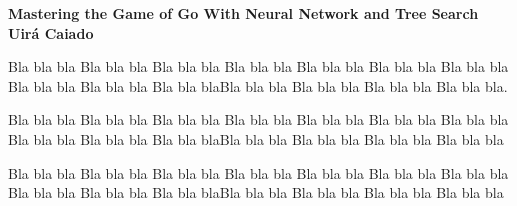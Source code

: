 \documentclass[a4paper]{article}
\begin{document}

\begin{center}

{\bf \large Mastering the Game of Go With Neural Network and Tree Search \\ \small Uirá Caiado}
\end{center}


Bla bla bla Bla bla bla Bla bla bla Bla bla bla Bla bla bla Bla bla bla Bla bla bla Bla bla bla Bla bla bla Bla bla blaBla bla bla Bla bla bla Bla bla bla Bla bla bla.

Bla bla bla Bla bla bla Bla bla bla Bla bla bla Bla bla bla Bla bla bla Bla bla bla Bla bla bla Bla bla bla Bla bla blaBla bla bla Bla bla bla Bla bla bla Bla bla bla

Bla bla bla Bla bla bla Bla bla bla Bla bla bla Bla bla bla Bla bla bla Bla bla bla Bla bla bla Bla bla bla Bla bla blaBla bla bla Bla bla bla Bla bla bla Bla bla bla \cite{Silver:2016hl}
































\end{document}
